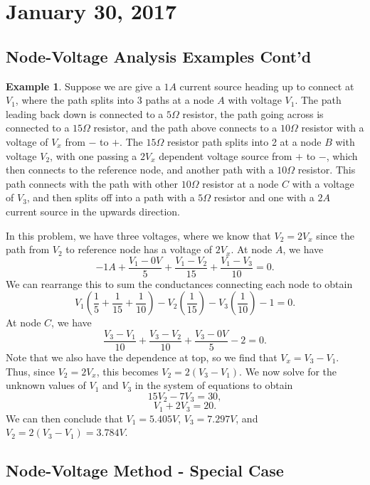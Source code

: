 \documentclass[11pt]{article}
\theoremstyle{plain} %
\theoremstyle{definition}
\theoremstyle{example}
\newtheorem*{example}{Example}
\theoremstyle{remark}
\begin{document}
\section{January 30, 2017}
\subsection{Node-Voltage Analysis Examples Cont'd}

\begin{example}
Suppose we are give a $1A$ current source heading up to connect at $V_1$, where the path splits into 3 paths at a node $A$ with voltage $V_1$. The path leading back down is connected to a $5\Omega$ resistor, the path going across is connected to a $15\Omega$ resistor, and the path above connects to a $10\Omega$ resistor with a voltage of $V_x$ from $-$ to $+$. The $15\Omega$ resistor path splits into 2 at a node $B$ with voltage $V_2$, with one passing a $2V_x$ dependent voltage source from $+$ to $-$, which then connects to the reference node, and another path with a $10\Omega$ resistor. This path connects with the path with other $10\Omega$ resistor at a node $C$ with a voltage of $V_3$, and then splits off into a path with a $5\Omega$ resistor and one with a $2A$ current source in the upwards direction. 
\end{example}

In this problem, we have three voltages, where we know that $V_2 = 2V_x$ since the path from $V_2$ to reference node has a voltage of $2V_x$. At node $A$, we have 
$$-1A + \frac{V_1-0V}{5} + \frac{V_1-V_2}{15} + \frac{V_1-V_3}{10} = 0.$$
We can rearrange this to sum the conductances connecting each node to obtain
$$V_1\left(\frac{1}{5} + \frac{1}{15} + \frac{1}{10}\right) -V_2\left(\frac{1}{15}\right) -V_3\left(\frac{1}{10}\right)-1=0.$$
At node $C$, we have 
$$\frac{V_3-V_1}{10} + \frac{V_3-V_2}{10} + \frac{V_3-0V}{5} - 2 = 0.$$
Note that we also have the dependence at top, so we find that $V_x = V_3-V_1$. Thus, since $V_2 = 2V_x$, this becomes $V_2 = 2(V_3-V_1)$. We now solve for the unknown values of $V_1$ and $V_3$ in the system of equations to obtain 
$$15V_2-7V_3 = 30,$$
$$V_1+2V_3 = 20.$$
We can then conclude that $V_1 = 5.405V$, $V_3 = 7.297V$, and $V_2 = 2(V_3-V_1) = 3.784V$.

\subsection{Node-Voltage Method - Special Case}
\end{document}

